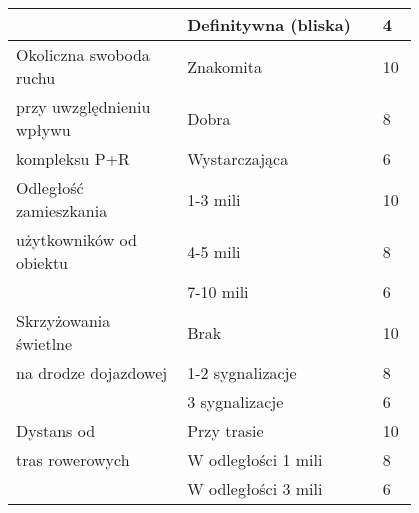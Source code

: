 \begin{table}[H]
\begin{tabular}{p{0.35\linewidth} p{0.4\linewidth} p{0.05\linewidth}}
               & Definitywna (bliska) & 4 \bigstrut[b]\\
    \hline
    Okoliczna swoboda ruchu  & Znakomita  & 10 \bigstrut[t]\\
    przy uwzględnieniu wpływu  & Dobra      & 8 \\
    kompleksu P+R & Wystarczająca & 6 \bigstrut[b]\\
    \hline
    Odległość zamieszkania  & 1-3 mili   & 10 \bigstrut[t]\\
    użytkowników od obiektu & 4-5 mili   & 8 \\
               & 7-10 mili  & 6 \bigstrut[b]\\
    \hline
    Skrzyżowania świetlne  & Brak       & 10 \bigstrut[t]\\
    na drodze dojazdowej & 1-2 sygnalizacje & 8 \\
               & 3 sygnalizacje & 6 \bigstrut[b]\\
    \hline
    Dystans od & Przy trasie & 10 \bigstrut[t]\\
    tras rowerowych & W odległości 1 mili & 8 \\
               & W odległości 3 mili & 6 \bigstrut[b]\\
    \hline
    \end{tabular}
    \label{aashto_tab1}
    \end{table}
    
